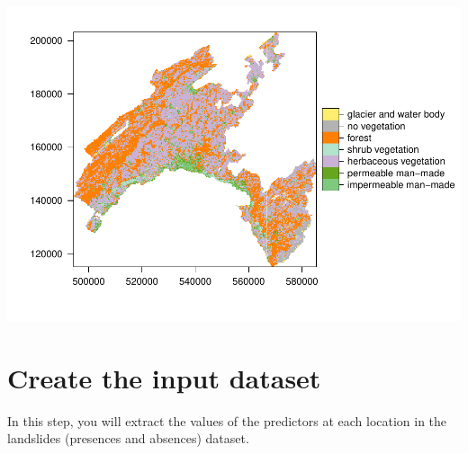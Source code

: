 \documentclass[
]{book}
\begin{document}
\includegraphics{06-RF_files/figure-latex/landCover-map-1.pdf}

\hypertarget{create-the-input-dataset}{%
\section{Create the input dataset}\label{create-the-input-dataset}}

In this step, you will extract the values of the predictors at each location in the landslides (presences and absences) dataset.
\end{document}
